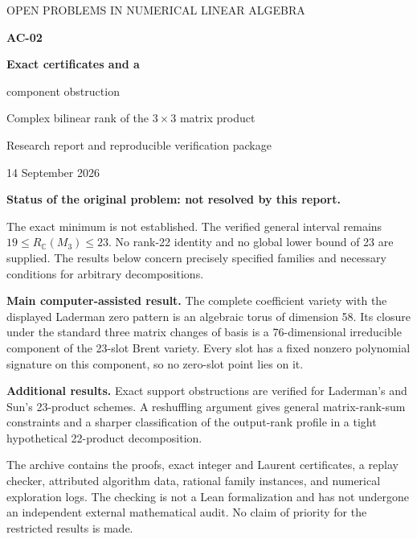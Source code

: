 \documentclass[11pt,letterpaper]{article}
\theoremstyle{definition}\newtheorem{definition}[theorem]{Definition}
\theoremstyle{remark}\newtheorem{remark}[theorem]{Remark}
\newcommand{\CC}{\mathbb C}\newcommand{\ZZ}{\mathbb Z}\newcommand{\QQ}{\mathbb Q}
\begin{document}
\begin{titlepage}
\vspace*{0.35in}
{\large\sffamily\color{ink} OPEN PROBLEMS IN NUMERICAL LINEAR ALGEBRA}\par
\vspace{0.55in}
{\Huge\bfseries\color{ink} AC-02}\par\vspace{0.2in}
{\LARGE\bfseries Exact certificates and a\par component obstruction}\par
\vspace{0.25in}
{\large Complex bilinear rank of the $3\times3$ matrix product}\par
\vspace{0.35in}
{\large Research report and reproducible verification package}\par
14 September 2026\par
\vspace{0.4in}
\begingroup\setlength{\fboxsep}{13pt}
\colorbox{soft}{\begin{minipage}{0.91\textwidth}
\textbf{Status of the original problem: not resolved by this report.}\par
The exact minimum is not established. The verified general interval remains
$19\le R_{\CC}(M_3)\le23$. No rank-22 identity and no global lower bound of 23
are supplied. The results below concern precisely specified families and
necessary conditions for arbitrary decompositions.
\end{minipage}}\endgroup\par
\vspace{0.3in}
\textbf{Main computer-assisted result.}
The complete coefficient variety with the displayed Laderman zero pattern
is an algebraic torus of dimension 58. Its closure under the standard three
matrix changes of basis is a 76-dimensional irreducible component of the
23-slot Brent variety. Every slot has a fixed nonzero polynomial signature
on this component, so no zero-slot point lies on it.

\textbf{Additional results.}
Exact support obstructions are verified for Laderman's and Sun's
23-product schemes. A reshuffling argument gives general matrix-rank-sum
constraints and a sharper classification of the output-rank profile in a
tight hypothetical 22-product decomposition.

\vfill
\small
The archive contains the proofs, exact integer and Laurent certificates,
a replay checker, attributed algorithm data, rational family instances,
and numerical exploration logs. The checking is not a Lean formalization
and has not undergone an independent external mathematical audit.
No claim of priority for the restricted results is made.
\end{titlepage}
\tableofcontents
\newpage
\end{document}
